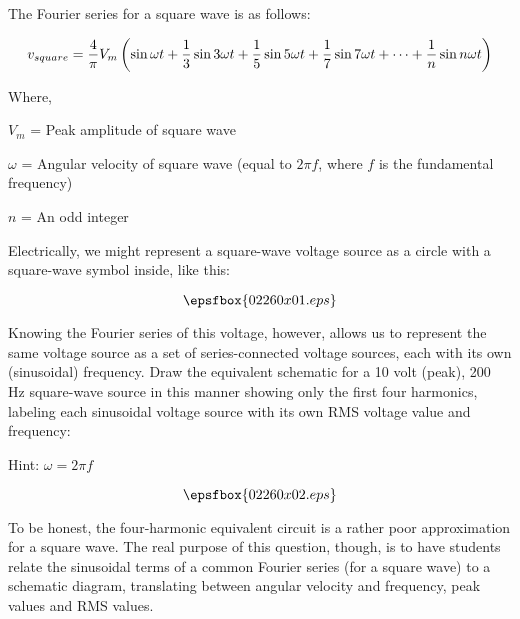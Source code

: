 

The Fourier series for a square wave is as follows:

$$v_{square} = {4 \over \pi}V_m \left(\sin \omega t + {1 \over 3}\sin 3 \omega t + {1 \over 5}\sin 5 \omega t + {1 \over 7} \sin 7 \omega t + \cdots + {1 \over n} \sin n \omega t \right)$$

\noindent
Where,

$V_m$ = Peak amplitude of square wave

$\omega$ = Angular velocity of square wave (equal to $2 \pi f$, where $f$ is the fundamental frequency)

$n$ = An odd integer

\vskip 10pt

Electrically, we might represent a square-wave voltage source as a circle with a square-wave symbol inside, like this:

$$\epsfbox{02260x01.eps}$$

Knowing the Fourier series of this voltage, however, allows us to represent the same voltage source as a set of series-connected voltage sources, each with its own (sinusoidal) frequency.  Draw the equivalent schematic for a 10 volt (peak), 200 Hz square-wave source in this manner showing only the first four harmonics, labeling each sinusoidal voltage source with its own RMS voltage value and frequency:

\vskip 60pt

Hint: $\omega = 2 \pi f$

\vskip 10pt







$$\epsfbox{02260x02.eps}$$







To be honest, the four-harmonic equivalent circuit is a rather poor approximation for a square wave.  The real purpose of this question, though, is to have students relate the sinusoidal terms of a common Fourier series (for a square wave) to a schematic diagram, translating between angular velocity and frequency, peak values and RMS values.

